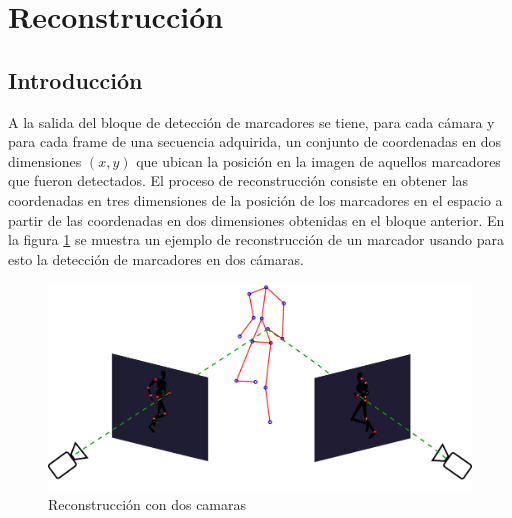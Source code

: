 


\section{Reconstrucción}
\subsection{Introducción}
A la salida del bloque de detección de marcadores se tiene, para cada cámara y para cada frame de una secuencia adquirida, un conjunto de coordenadas en dos dimensiones $(x,y)$ que ubican la posición en la imagen de aquellos marcadores que fueron detectados.
El proceso de reconstrucción consiste en obtener las coordenadas en tres dimensiones de la posición de los marcadores en el espacio a partir de las coordenadas en dos dimensiones obtenidas en el bloque anterior.
En la figura \ref{fig: esquema_reconstruccion} se muestra un ejemplo de reconstrucción de un marcador usando para esto la detección de marcadores en dos cámaras.\\

\begin{figure}[!ht]
\begin{center}
\includegraphics[scale=0.20]{img/Reconstruccion/reconstruccion}

\end{center}
\caption{Reconstrucción con dos camaras}
\label{fig: esquema_reconstruccion}
\end{figure}

